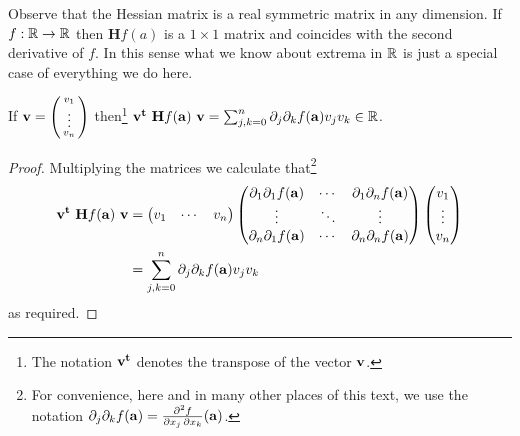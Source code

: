 Observe that the Hessian matrix is a real symmetric matrix in any dimension.
If \(f:\bR \to \bR\) then \(\mathbf{H} f (a)\) is a \(1\times 1\) matrix and coincides with the second derivative of \(f\).
In this sense what we know about extrema in \(\bR\) is just a special case of everything we do here.

\begin{lemma*}
    If \(\vv= \left( \begin{smallmatrix}
            v_1\\ \vdots \\v_n
        \end{smallmatrix} \right)  \) then\footnote{The notation \(\vv^{\mathbf{t}}\) denotes the transpose of the vector \(\vv\).} \(\vv^{\mathbf{t}} \ \mathbf{H} f (\aa) \ \vv = \sum_{j,k=0}^{n}
    \partial_{j}\partial_{k}f(\aa)
    v_j v_k \in \bR\).
\end{lemma*}

\begin{proof}
    Multiplying the matrices we calculate that\footnote{For convenience, here and in many other places of this text, we use the notation
        \(\partial_{j}\partial_{k}f(\aa) = \frac{\partial^2 f}{\partial x_j\,\partial x_k} (\aa)\).}
    \[
        \begin{aligned}
            \vv^{\mathbf{t}} \ \mathbf{H} f (\aa) \ \vv
             & =
            \begin{pmatrix}
                v_1 & \cdots & v_n
            \end{pmatrix}
            \begin{pmatrix}
                \partial_{1}\partial_{1}f(\aa) & \cdots &
                \partial_{1}\partial_{n}f(\aa)                   \\
                \vdots                         & \ddots & \vdots \\
                \partial_{n}\partial_{1}f(\aa) & \cdots &
                \partial_{n}\partial_{n}f(\aa)
            \end{pmatrix}
            \begin{pmatrix}
                v_1 \\ \vdots \\v_n
            \end{pmatrix} \\
             & = \sum_{j,k=0}^{n}
            \partial_{j}\partial_{k}f(\aa)
            v_j v_k
        \end{aligned}
    \]
    as required.
\end{proof}


